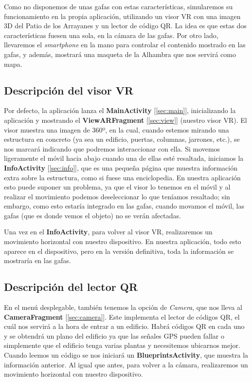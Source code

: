 \documentclass[11pt,a4paper]{article}
\begin{document}
Como no disponemos de unas gafas con estas características, simularemos su funcionamiento en la propia aplicación, utilizando un visor
VR con una imagen 3D del Patio de los Arrayanes y un lector de código QR. La idea es que estas dos características fuesen una sola, en
la cámara de las gafas. Por otro lado, llevaremos el \textit{smartphone} en la mano para controlar el contenido mostrado en las gafas, y
además, mostrará una maqueta de la Alhambra que nos servirá como mapa.

\subsection{Descripción del visor VR}
\label{sec:vr}

Por defecto, la aplicación lanza el \textbf{MainActivity} [\ref{sec:main}], inicializando la aplicación y mostrando el \textbf{ViewARFragment}
[\ref{sec:view}] (nuestro visor VR). El visor muestra una imagen de 360º, en la cual, cuando estemos mirando una estructura en concreto
(ya sea un edificio, puertas, columnas, jarrones, etc.), se nos marcará indicando que podremos interaccionar con ella.
Si movemos ligeramente el móvil hacia abajo cuando una de ellas esté resaltada, iniciamos la \textbf{InfoActivity} [\ref{sec:info}],
que es una pequeña página que muestra información extra sobre la estructura, como si fuese una enciclopedia. En nuestra aplicación esto
puede suponer un problema, ya que el visor lo tenemos en el móvil y al realizar el movimiento podemos deseleccionar lo que teníamos
resaltado; sin embargo, como esto estaría integrado en las gafas, cuando movamos el móvil, las gafas (que es donde vemos el objeto) no
se verán afectadas.

Una vez en el \textbf{InfoActivity}, para volver al visor VR, realizaremos un movimiento horizontal con nuestro dispositivo.
En nuestra aplicación, todo esto aparece en el dispositivo, pero en la versión definitiva, toda la información se mostraría en
las gafas.

\subsection{Descripción del lector QR}

En el menú desplegable, también tenemos la opción de \textit{Camera}, que nos lleva al \textbf{CameraFragment} [\ref{sec:camera}]. Este
implementa el lector de códigos QR, el cuál nos servirá a la hora de entrar a un edificio. Habrá códigos QR en cada uno y se obtendrá un
plano del edificio ya que las señales GPS pueden fallar o simplemente que el edificio tenga varias plantas y necesitemos ubicarnos mejor.
Cuando leemos un código se nos iniciará un \textbf{BlueprintsActivity}, que muestra la información anterior. Al igual que antes, para
volver a la cámara, realizaremos un movimiento horizontal con nuestro dispositivo.
\end{document}
